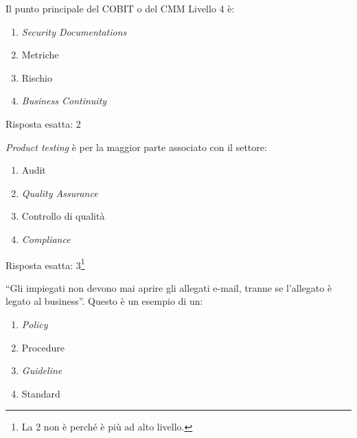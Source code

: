 \begin{Exercise} [
  title={Quiz},
  label={esSM3}
  ]

  \Question Il punto principale del COBIT o del CMM Livello 4 è:
  \begin{enumerate}
   \item \textit{Security Documentations}
   \item Metriche
   \item Rischio
   \item \textit{Business Continuity}
  \end{enumerate}
  
\end{Exercise}

\begin{Answer} [
  ref={esSM3},
  number={3}
  ]

  \Question Risposta esatta: 2
\end{Answer}


\begin{Exercise} [
  title={Quiz},
  label={esSM4}
  ]

  \Question \textit{Product testing} è per la maggior parte associato con il 
settore:
\begin{enumerate}
 \item Audit
 \item \textit{Quality Assurance}
 \item Controllo di qualità
 \item \textit{Compliance}
\end{enumerate}
  
\end{Exercise}

\begin{Answer} [
  ref={esSM4},
  number={4}
  ]

  \Question Risposta esatta: 3\footnote{La 2 non è perché è più ad alto 
livello.}
\end{Answer}


\begin{Exercise} [
  title={Quiz},
  label={esSM5}
  ]

  \Question ``Gli impiegati non devono mai aprire gli allegati e-mail, tranne 
se l'allegato è legato al business''. Questo è un esempio di un:
\begin{enumerate}
 \item \textit{Policy}
 \item Procedure
 \item \textit{Guideline}
 \item Standard
\end{enumerate}
  
\end{Exercise}

